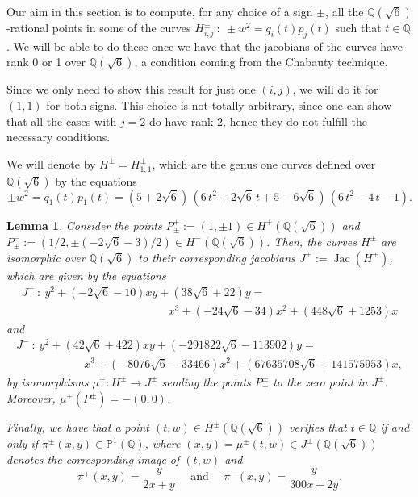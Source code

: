 \documentclass[a4paper,12pt]{amsart}
\newtheorem{lem}[thm]{Lemma}
\theoremstyle{remark}
\theoremstyle{definition}
\begin{document}
Our aim in this section is to compute, for any choice of a sign
$\pm$, all the ${{\mathbb{Q}}}(\sqrt{6})$-rational points in some of the
curves $H_{i,j}^{\pm } \ : \ \pm w^2=q_i(t)p_j(t)$ such that $t\in
{{\mathbb{Q}}}$. We will be able to do these once we have that the jacobians
of the curves have rank 0 or 1 over ${{\mathbb{Q}}}(\sqrt{6})$, a condition
coming from the Chabauty technique.

Since we only need to show this result for just one $(i,j)$, we
will do it for $(1,1)$ for both signs. This choice is not totally
arbitrary, since one can show that all the cases with $j=2$ do
have rank $2$, hence they do not fulfill the necessary conditions.

We will denote by $H^{\pm}=H^{\pm}_{1,1}$, which are the genus one
curves defined over ${{\mathbb{Q}}}(\sqrt{6})$ by the equations
$$ \pm
w^2=q_1(t)p_1(t)=(5+2\sqrt{6})\,(6\,t^2+2\sqrt{6}\,t+5-6\sqrt{6})\,(6\,t^2-4\,t-1).$$

\begin{lem}\label{jacobiansH} Consider the points $P^+_{\pm}:=(1,\pm 1)\in
H^{+}({{\mathbb{Q}}}(\sqrt{6}))$ and $P^-_{\pm}:=(1/2, \pm (-2\sqrt{6} - 3)/2
)\in H^{-}({{\mathbb{Q}}}(\sqrt{6}))$. Then, the curves $H^{\pm}$ are
isomorphic over ${{\mathbb{Q}}}(\sqrt{6})$ to their corresponding jacobians
$J^{\pm}:=\operatorname{Jac}(H^{\pm})$, which are given by the equations
$$\begin{array}{l}
J^{+} \ : \  y^2 + (-2\sqrt{6} - 10)xy + (38\sqrt{6} + 22)y = \\
 \qquad\qquad\qquad\qquad\qquad\qquad\quad x^3 + (-24\sqrt{6} - 34)x^2 + (448\sqrt{6} + 1253)x
\end{array} $$
and
$$
\begin{array}{l}
J^{-} \ : \  y^2 + (42\sqrt{6} + 422)xy + (-291822\sqrt{6} -113902)y = \\
  \qquad\qquad\qquad x^3 + (-8076\sqrt{6} - 33466)x^2 + (67635708\sqrt{6} +
141575953)x , \end{array} $$ by isomorphisms $\mu^{\pm}: H^{\pm}\to J^{\pm}$
sending the points $P^{\pm}_{+}$ to the zero point in $J^{\pm}$. Moreover,
$\mu^{\pm}(P^{\pm}_{-})=-(0,0)$.

 Finally, we have
that a point $(t,w)\in H^{\pm}({{\mathbb{Q}}}(\sqrt{6}))$ verifies that $t\in
{{\mathbb{Q}}}$ if and only if $\pi^{\pm}(x,y)\in {{\mathbb{P}}}^1({{\mathbb{Q}}})$, where
$(x,y)=\mu^{\pm}(t,w)\in J^{\pm}({{\mathbb{Q}}}(\sqrt{6}))$ denotes the corresponding
image of $(t,w)$ and
$$\pi^+(x,y)=\frac {y}{2x + y} \quad \mbox{ and }\quad \pi^-(x,y)=\frac {y}{300x +
2y}.$$
\end{lem}
\end{document}

